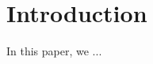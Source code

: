 \documentclass{mpaper}
\begin{document}
\section{Introduction}

%







In this paper, we ...




\end{document}
